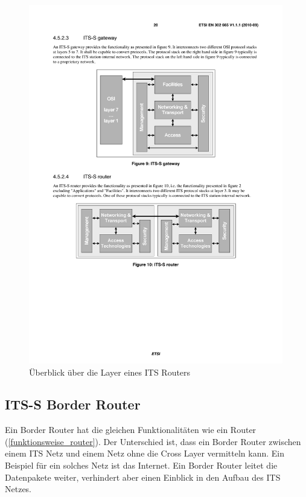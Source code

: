 \begin{figure}
	\includegraphics[width=0.99\textwidth]{content/images/01_funktionsweise/layer_router.pdf}
	\caption{Überblick über die Layer eines ITS Routers \cite{en302665}}
	\label{fig:funktionsweise_layerHost}
\end{figure}



\subsection{ITS-S Border Router \label{funktionsweise_ITSBorderRouter}}
Ein Border Router hat die gleichen Funktionalitäten wie ein Router (\autoref{funktionsweise_router}). Der Unterschied ist, dass ein Border Router zwischen einem \ac{ITS} Netz und einem Netz ohne die Cross Layer vermitteln kann. Ein Beispiel für ein solches Netz ist das Internet. Ein Border Router leitet die Datenpakete weiter, verhindert aber einen Einblick in den Aufbau des \ac{ITS} Netzes. 

